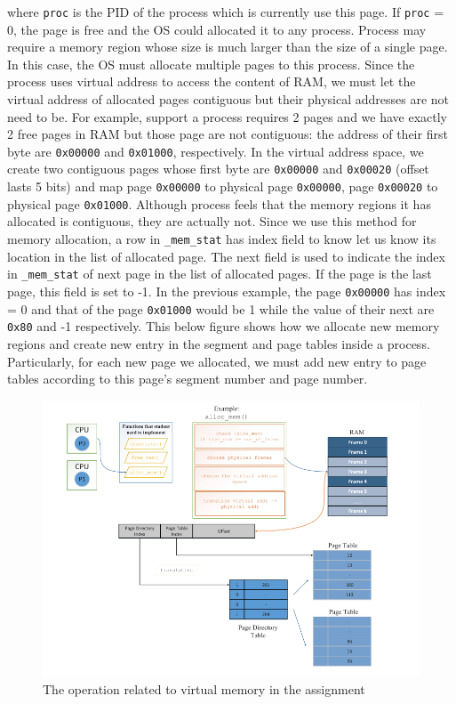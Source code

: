 \documentclass[a4paper]{article}
\numberwithin{equation}{section}
\begin{document}
where \texttt{proc} is the PID of the process which is currently use this page. If \texttt{proc} = 0, the page is free and the OS could allocated it to any process. Process may require a memory region whose size is much larger than the size of a single page. In this case, the OS must allocate multiple pages to this process. Since the process uses virtual address to access the content of RAM, we must let the virtual address of allocated pages contiguous but their physical addresses are not need to be. For example, support a process requires 2 pages and we have exactly 2 free pages in RAM but those page are not contiguous: the address of their first byte are \texttt{0x00000} and \texttt{0x01000}, respectively. In the virtual address space, we create two contiguous pages whose first byte are \texttt{0x00000} and \texttt{0x00020} (offset lasts 5 bits) and map page \texttt{0x00000} to physical page \texttt{0x00000}, page \texttt{0x00020} to physical page \texttt{0x01000}. Although process feels that the memory regions it has allocated is contiguous, they are actually not. Since we use this method for memory allocation, a row in \texttt{_mem_stat} has index field to know let us know its location in the list of allocated page. The next field is used to indicate the index in \texttt{_mem_stat} of next page in the list of allocated pages. If the page is the last page, this field is set to -1. In the previous example, the page \texttt{0x00000} has index = 0 and that of the page \texttt{0x01000} would be 1 while the value of their next are \texttt{0x80} and -1 respectively. This below figure shows how we allocate new memory regions and create new entry in the segment and page tables inside a process. Particularly, for each new page we allocated, we must add new entry to page tables according to this page’s segment number and page number.

\begin{figure}[H]
    \centering
    \includegraphics[width=1\textwidth]{mem_map.png}
    \caption{The operation related to virtual memory in the assignment}
    \label{fig:mem_manange_figure}
\end{figure}
\end{document}
